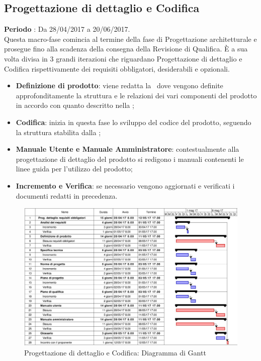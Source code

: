 \documentclass[../PianoDiProgetto.tex]{subfiles}
\begin{document}
		\subsection{Progettazione di dettaglio e Codifica}
		\textbf{Periodo} : Da 28/04/2017 a 20/06/2017. \\
		Questa macro-fase comincia al termine della fase di Progettazione architetturale e prosegue fino alla scadenza della consegna della Revisione di Qualifica.
		È a sua volta divisa in 3 grandi iterazioni che riguardano Progettazione di dettaglio e Codifica rispettivamente dei requisiti obbligatori, desiderabili e opzionali.
		\begin{itemize}
			\item \textbf{Definizione di prodotto}: viene redatta la \ dove vengono definite approfonditamente la struttura e le relazioni dei vari componenti del prodotto in accordo con quanto descritto nella \specificatecnica ;
			\item \textbf{Codifica}: inizia in questa fase lo sviluppo del codice del prodotto, seguendo la struttura stabilita dalla  ;
			\item \textbf{Manuale Utente e Manuale Amministratore}: contestualmente alla progettazione di dettaglio del prodotto si redigono i manuali contenenti le linee guida per l'utilizzo del prodotto; 
			\item \textbf{Incremento e Verifica}: se necessario vengono aggiornati e verificati i documenti redatti in precedenza.
		\end{itemize}
		\begin{figure}[H]
			\centering
			\includegraphics[scale=0.55]{Figures/Gantt_DettaglioObbligatori}
			\caption{Progettazione di dettaglio e Codifica: Diagramma di Gantt}
		\end{figure}
\end{document}
